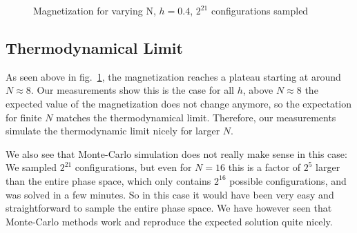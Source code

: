 \documentclass{scrartcl}
\begin{document}
	\begin{figure}[htbp]
		
		\caption{Magnetization for varying N, $h=0.4$, $2^{21}$ configurations sampled}
		\label{fig:magvarN}
	\end{figure}
	
\subsection{Thermodynamical Limit}

As seen above in fig.~\ref{fig:magvarN}, the magnetization reaches a plateau starting at around $N\approx 8$. Our measurements show this is the case for all $h$, above $N\approx 8$ the expected value of the magnetization does not change anymore, so the expectation for finite $N$ matches the thermodynamical limit. Therefore, our measurements simulate the thermodynamic limit nicely for larger $N$.

We also see that Monte-Carlo simulation does not really make sense in this case: We sampled $2^{21}$ configurations, but even for $N=16$ this is a factor of $2^5$ larger than the entire phase space, which only contains $2^{16}$ possible configurations, and was solved in a few minutes. So in this case it would have been very easy and straightforward to sample the entire phase space. We have however seen that Monte-Carlo methods work and reproduce the expected solution quite nicely.
	
%	
	
\newpage	
\listoffigures
\printbibliography
\end{document}
